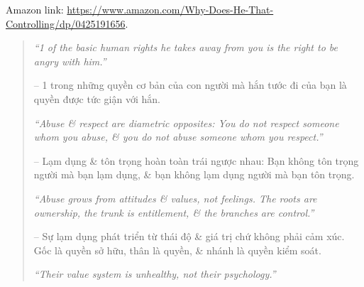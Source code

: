 \documentclass{article}
\begin{document}
\begin{enumerate}
	Amazon link: \url{https://www.amazon.com/Why-Does-He-That-Controlling/dp/0425191656}.
	\begin{quotation}
		{\it``1 of the basic human rights he takes away from you is the right to be angry with him.''}
		
		-- 1 trong những quyền cơ bản của con người mà hắn tước đi của bạn là quyền được tức giận với hắn.
		
		{\it``Abuse \& respect are diametric opposites: You do not respect someone whom you abuse, \& you do not abuse someone whom you respect.''}
		
		-- Lạm dụng \& tôn trọng hoàn toàn trái ngược nhau: Bạn không tôn trọng người mà bạn lạm dụng, \& bạn không lạm dụng người mà bạn tôn trọng.
		
		{\it``Abuse grows from attitudes \& values, not feelings. The roots are ownership, the trunk is entitlement, \& the branches are control.''}
		
		-- Sự lạm dụng phát triển từ thái độ \& giá trị chứ không phải cảm xúc. Gốc là quyền sở hữu, thân là quyền, \& nhánh là quyền kiểm soát.
		
		{\it``Their value system is unhealthy, not their psychology.''}
		

\end{quotation}
\end{enumerate}
\end{document}
